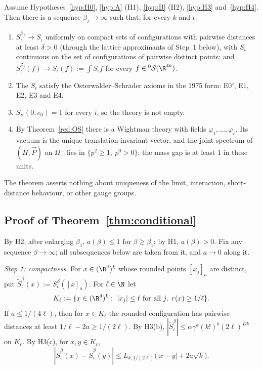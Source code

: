 \begin{theorem}[Theorem S]\label{thm:conditional}
Assume Hypotheses~\ref{hyp:H0}, \ref{hyp:A} (H1), \ref{hyp:B} (H2), \ref{hyp:H3} and~\ref{hyp:H4}. Then there is a sequence $\beta_j\to\infty$ such that, for every $k$ and $\iota$:
\begin{enumerate}
\item $S^{\beta_j}_\iota\to S_\iota$ uniformly on compact sets of configurations with pairwise distances at least $\delta>0$ (through the lattice approximants of Step~1 below), with $S_\iota$ continuous on the set of configurations of pairwise distinct points; and $S^{\beta_j}_\iota(f)\to S_\iota(f):=\int S_\iota f$ for every $f\in{}^0\mathcal S(\R^{4k})$.
\item The $S_\iota$ satisfy the Osterwalder--Schrader axioms in the 1975 form: E0$'$, E1, E2, E3 and E4.
\item $S_{ii}(0,e_0)=1$ for every $i$, so the theory is not empty.
\item By Theorem~\ref{red:OS} there is a Wightman theory with fields $\varphi_1,\dots,\varphi_r$. Its vacuum is the unique translation-invariant vector, and the joint spectrum of $(H,\vec P)$ on $\Omega^\perp$ lies in $\{p^2\ge1,\ p^0>0\}$: the mass gap is at least $1$ in these units.
\end{enumerate}
The theorem asserts nothing about uniqueness of the limit, interaction, short-distance behaviour, or other gauge groups.
\end{theorem}

\subsection{Proof of Theorem~\ref{thm:conditional}}\label{red:S-proof}

By H2, after enlarging $\beta_1$, $a(\beta)\le1$ for $\beta\ge\beta_1$; by H1, $a(\beta)>0$. Fix any sequence $\beta\to\infty$; all subsequences below are taken from it, and $a\to0$ along it.

\emph{Step 1: compactness.} For $x\in(\R^4)^k$ whose rounded points $[x_j]_a$ are distinct, put $\tilde S^\beta_\iota(x):=S^\beta_\iota([x]_a)$. For $\ell\in\N$ let
\[
  K_\ell:=\{x\in(\R^4)^k:\ |x_j|\le\ell\text{ for all }j,\ r(x)\ge1/\ell\}.
\]
If $a\le1/(4\ell)$, then for $x\in K_\ell$ the rounded configuration has pairwise distances at least $1/\ell-2a\ge1/(2\ell)$. By H3(b), $|\tilde S^\beta_\iota|\le\alpha\gamma^k(k!)^b(2\ell)^{Dk}$ on $K_\ell$. By H3(c), for $x,y\in K_\ell$,
\begin{equation}\label{red:asym-eq}
  |\tilde S^\beta_\iota(x)-\tilde S^\beta_\iota(y)|\le L_{k,1/(2\ell)}\bigl(|x-y|+2a\sqrt k\bigr).
\end{equation}

